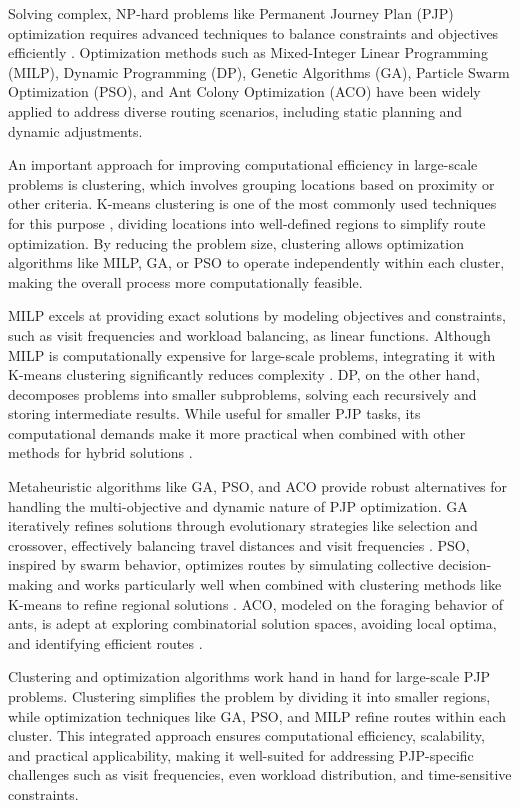 Solving complex, NP-hard problems like Permanent Journey Plan (PJP) optimization requires advanced techniques to balance constraints and objectives efficiently \cite{Alam_Sulaiman_2022}. Optimization methods such as Mixed-Integer Linear Programming (MILP), Dynamic Programming (DP), Genetic Algorithms (GA), Particle Swarm Optimization (PSO), and Ant Colony Optimization (ACO) have been widely applied to address diverse routing scenarios, including static planning and dynamic adjustments.

An important approach for improving computational efficiency in large-scale problems is clustering, which involves grouping locations based on proximity or other criteria. K-means clustering is one of the most commonly used techniques for this purpose \cite{Alam_Sulaiman_2022}, dividing locations into well-defined regions to simplify route optimization. By reducing the problem size, clustering allows optimization algorithms like MILP, GA, or PSO to operate independently within each cluster, making the overall process more computationally feasible.

MILP excels at providing exact solutions by modeling objectives and constraints, such as visit frequencies and workload balancing, as linear functions. Although MILP is computationally expensive for large-scale problems, integrating it with K-means clustering significantly reduces complexity \cite{Laporte2017}.
DP, on the other hand, decomposes problems into smaller subproblems, solving each recursively and storing intermediate results. While useful for smaller PJP tasks, its computational demands make it more practical when combined with other methods for hybrid solutions \cite{feidiao_yang__2018}.

Metaheuristic algorithms like GA, PSO, and ACO provide robust alternatives for handling the multi-objective and dynamic nature of PJP optimization. GA iteratively refines solutions through evolutionary strategies like selection and crossover, effectively balancing travel distances and visit frequencies \cite{Konak_Coit_Smith_2006}. PSO, inspired by swarm behavior, optimizes routes by simulating collective decision-making and works particularly well when combined with clustering methods like K-means to refine regional solutions \cite{Hughes_Goerigk_Dokka_2020}. ACO, modeled on the foraging behavior of ants, is adept at exploring combinatorial solution spaces, avoiding local optima, and identifying efficient routes \cite{articleACO}.

Clustering and optimization algorithms work hand in hand for large-scale PJP problems. Clustering simplifies the problem by dividing it into smaller regions, while optimization techniques like GA, PSO, and MILP refine routes within each cluster. This integrated approach ensures computational efficiency, scalability, and practical applicability, making it well-suited for addressing PJP-specific challenges such as visit frequencies, even workload distribution, and time-sensitive constraints.

